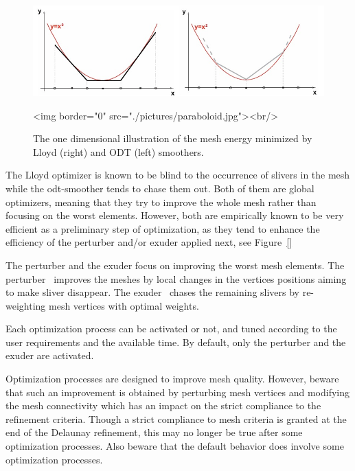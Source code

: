 \begin{figure}[ht]
\begin{center}
 \begin{ccTexOnly}
   \includegraphics[width=\textwidth]{Mesh_3/pictures/paraboloid}
 \end{ccTexOnly}
 \begin{ccHtmlOnly}
   <img border="0" src="./pictures/paraboloid.jpg"><br/>
 \end{ccHtmlOnly}
 \caption{The one dimensional illustration of the mesh energy minimized by Lloyd (right)  and ODT (left) smoothers.}
  \label{figure:ODT_Lloyd_energy}
\end{center}
\end{figure}

 The Lloyd optimizer is known to be blind to the occurrence of slivers in the mesh 
while the odt-smoother tends to chase them out.
Both of them are global optimizers, 
meaning that they try to improve
the whole mesh rather than focusing on the worst elements. However, both  are empirically known
to be very efficient as a preliminary step of optimization, as they tend to enhance the
efficiency of the perturber and/or exuder applied next, see Figure~\ref{}

The perturber and  the exuder focus on improving the worst mesh elements.
The perturber~\cite{cgal:tsa-ps3dd-09} improves the meshes by local changes
in  the vertices positions
aiming to make sliver disappear. The exuder~\cite{cgal:cdeft-slive-00}
chases the remaining slivers by
re-weighting mesh vertices with  optimal weights.

Each optimization process can be activated or not, and tuned
according to the user requirements and the available time.
By default, only the perturber and  the exuder are activated.

Optimization processes are designed to improve mesh quality. However, beware that such an improvement
is obtained by perturbing mesh vertices and modifying the mesh connectivity which has an impact
on the strict compliance to the refinement criteria. Though a strict compliance to mesh criteria
is granted at the end of the Delaunay refinement, this may  no longer be true after
some optimization processes. Also beware that the default behavior does involve some
optimization processes.


